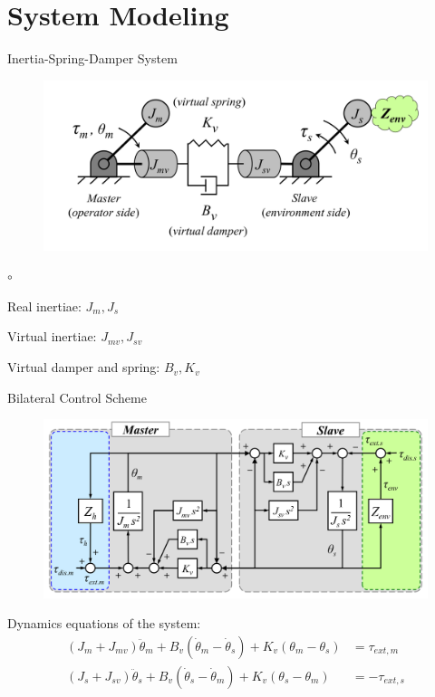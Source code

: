 \documentclass[10pt]{beamer}
\begin{document}
\section{System Modeling}

\begin{frame}{Inertia-Spring-Damper System}
	
	\begin{figure}[h]
	\centering
	\includegraphics[width=0.8\linewidth]{../reportTeleop/Images/spring_damper_inertia_system}
	\end{figure}

	
	\begin{list}{$ \circ $}{}
		\item Real inertiae: $ J_{m}, J_{s} $
		\item Virtual inertiae: $ J_{mv}, J_{sv} $
		\item Virtual damper and spring: $ B_{v}, K_{v} $
	\end{list}

\end{frame}

\begin{frame}{Bilateral Control Scheme}

	\begin{figure}
	\centering
	\includegraphics[width=0.8\linewidth]{../reportTeleop/Images/Block_diagram}
	\end{figure}

Dynamics equations of the system:
\begin{align*}
(J_m + J_{mv})\ddot{\theta}_m + B_v (\dot{\theta}_m - \dot{\theta}_s) + K_v(\theta_m - \theta_s) &= \tau_{ext,m} \\
(J_s + J_{sv})\ddot{\theta}_s + B_v (\dot{\theta}_s - \dot{\theta}_m) + K_v(\theta_s - \theta_m) &= - \tau_{ext,s} 
\end{align*}
	
\end{frame}
\end{document}
